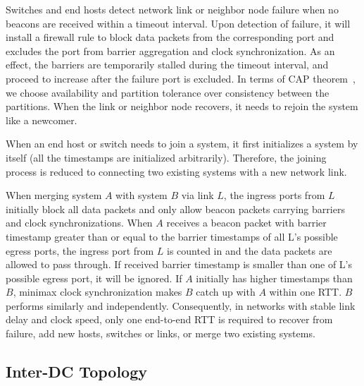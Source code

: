 

Switches and end hosts detect network link or neighbor node failure when no beacons are received within a timeout interval.
Upon detection of failure, it will install a firewall rule to block data packets from the corresponding port and excludes the port from barrier aggregation and clock synchronization.
As an effect, the barriers are temporarily stalled during the timeout interval, and proceed to increase after the failure port is excluded.
In terms of CAP theorem~\cite{brewer2000towards}, we choose availability and partition tolerance over consistency between the partitions.
When the link or neighbor node recovers, it needs to rejoin the \sys system like a newcomer.

When an end host or switch needs to join a \sys system, it first initializes a \sys system by itself (all the timestamps are initialized arbitrarily). Therefore, the joining process is reduced to connecting two existing \sys systems with a new network link.

When merging \sys system $A$ with system $B$ via link $L$, the ingress ports from $L$ initially block all data packets and only allow beacon packets carrying barriers and clock synchronizations. 
When $A$ receives a beacon packet with barrier timestamp greater than or equal to the barrier timestamps of all L's possible egress ports, the ingress port from $L$ is counted in and the data packets are allowed to pass through.
If received barrier timestamp is smaller than one of L's possible egress port, it will be ignored.
If $A$ initially has higher timestamps than $B$, minimax clock synchronization makes $B$ catch up with $A$ within one RTT.
$B$ performs similarly and independently.
Consequently, in networks with stable link delay and clock speed, only one end-to-end RTT is required to recover from failure, add new hosts, switches or links, or merge two existing \sys systems.

\iffalse
\subsection{Inter-DC Topology}
\label{sec:inter-dc}


